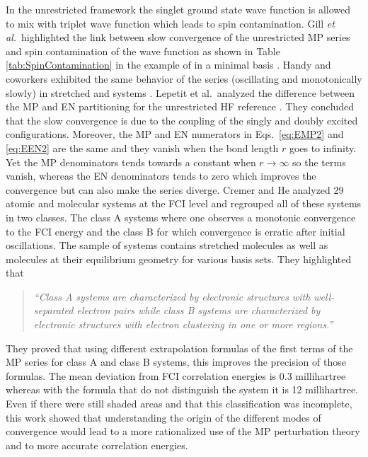 \documentclass[11pt,a4paper]{article}
\begin{document}
In the unrestricted framework the singlet ground state wave function is allowed to mix with triplet wave function which leads to spin contamination. Gill \textit{et al.}~highlighted the link between slow convergence of the unrestricted MP series and spin contamination of the wave function as shown in Table \ref{tab:SpinContamination} in the example of  in a minimal basis \cite{Gill_1988}. 
Handy and coworkers exhibited the same behavior of the series (oscillating and monotonically slowly) in stretched  and  systems \cite{Handy_1985}. Lepetit et al.~analyzed the difference between the MP and EN partitioning for the unrestricted HF reference \cite{Lepetit_1988}. They concluded that the slow convergence is due to the coupling of the singly and doubly excited configurations. Moreover, the MP and EN numerators in Eqs.~\eqref{eq:EMP2} and \eqref{eq:EEN2} are the same and they vanish when the bond length $r$ goes to infinity. Yet the MP denominators tends towards a constant when $r \to \infty$ so the terms vanish, whereas the EN denominators tends to zero which improves the convergence but can also make the series diverge.
Cremer and He analyzed 29 atomic and molecular systems at the FCI level \cite{Cremer_1996} and regrouped all of these systems in two classes. The class A systems where one observes a monotonic convergence to the FCI energy and the class B for which convergence is erratic after initial oscillations. The sample of systems contains stretched molecules as well as molecules at their equilibrium geometry for various basis sets. They highlighted that \cite{Cremer_1996}
\begin{quote}
	\textit{``Class A systems are characterized by electronic structures with well-separated electron pairs while class B systems are characterized by electronic structures with electron clustering in one or more regions.''}
\end{quote}
They proved that using different extrapolation formulas of the first terms of the MP series for class A and class B systems, this improves the precision of those formulas. The mean deviation from FCI correlation energies is $0.3$ millihartree whereas with the formula that do not distinguish the system it is 12 millihartree. Even if there were still shaded areas and that this classification was incomplete, this work showed that understanding the origin of the different modes of convergence would lead to a more rationalized use of the MP perturbation theory and to more accurate correlation energies.
\end{document}
